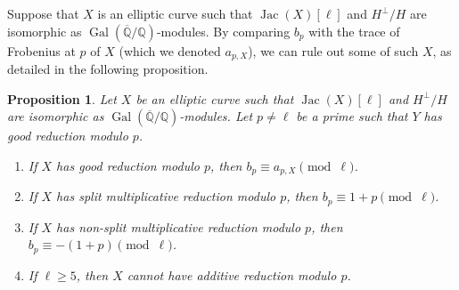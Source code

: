 \documentclass{amsproc}
\numberwithin{equation}{section}
\newtheorem{proposition}[equation]{Proposition}
\theoremstyle{definition}
\theoremstyle{remark}
\DeclareMathOperator{\Jac}{Jac}
\DeclareMathOperator{\Gal}{Gal}
\newcommand{\QQ}{\mathbb Q}
\newcommand{\Qbar}{\overline{\QQ}}
\newcommand{\GalQ}{\Gal(\Qbar/\QQ)}
\begin{document}
Suppose that $X$ is an elliptic curve such that $\Jac(X)[\ell]$
and $H^\perp/H$ are isomorphic as $\GalQ$-modules.
By comparing $b_p$ with the trace of Frobenius at $p$ of $X$ (which we denoted $a_{p,X}$), we can rule out some of such $X$, as detailed in the following proposition.
\begin{proposition}
    \label{prop:frob_traces}
    Let $X$ be an elliptic curve such that 
    $\Jac(X)[\ell]$ and $H^\perp/H$ are isomorphic as $\GalQ$-modules.
    Let $p\neq\ell$ be a prime such that $Y$ has good reduction modulo $p$.
    \begin{enumerate}[label=(\roman*)]
    \item If $X$ has good reduction modulo $p$, then $b_p\equiv a_{p,X}\pmod\ell$.
    \item If $X$ has split multiplicative reduction modulo $p$, then $b_p \equiv 1+p\pmod{\ell}$.
    \item If $X$ has non-split multiplicative reduction modulo $p$, then $b_p \equiv -(1+p)\pmod{\ell}$.
    \item If $\ell\geq 5$, then $X$ cannot have additive reduction modulo $p$.
    \end{enumerate}
\end{proposition}
\end{document}
